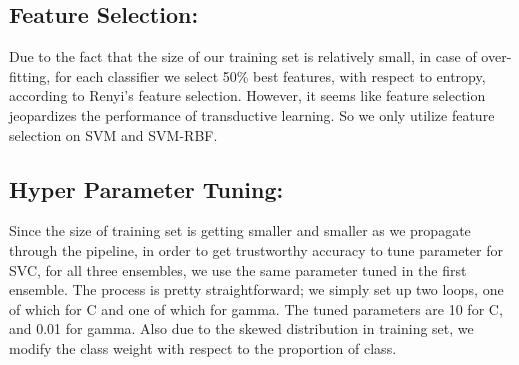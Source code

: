 \subsection{Feature Selection:}
Due to the fact that the size of our training set is relatively small, in case of over-fitting, for each classifier we select 50\% best features, with respect to entropy, according to Renyi's feature selection.\cite{b14} However, it seems like feature selection jeopardizes the performance of transductive learning. So we only utilize feature selection on SVM and SVM-RBF.

\subsection{Hyper Parameter Tuning:}
Since the size of training set is getting smaller and smaller as we propagate through the pipeline, in order to get trustworthy accuracy to tune parameter for SVC, for all three ensembles, we use the same parameter tuned in the first ensemble. The process is pretty straightforward; we simply set up two loops, one of which for C and one of which for gamma. The tuned parameters are 10 for C, and 0.01 for gamma. Also due to the skewed distribution in training set, we modify the class weight with respect to the proportion of class. 


